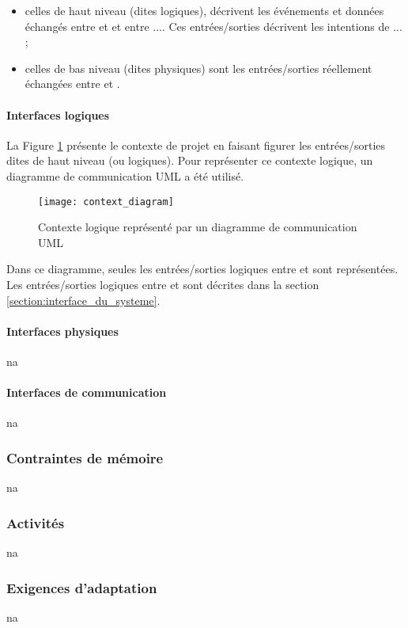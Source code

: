 \begin{itemize}
    \item celles de haut niveau (dites logiques), décrivent les événements et données échangés entre \complete et \complete et entre ...\complete. Ces entrées/sorties décrivent les intentions de \complete ... ;
    \item celles de bas niveau (dites physiques) sont les entrées/sorties réellement échangées entre \complete et \complete.
\end{itemize}

\paragraph{Interfaces logiques} %
La Figure \ref{contexte_logiqueUML} présente le contexte de projet en faisant figurer les entrées/sorties dites de haut niveau (ou logiques). Pour représenter ce contexte logique, un diagramme de communication UML a été utilisé.

\begin{figure} [H]
    \centering
    \texttt{[image: context\_diagram]}
    \caption{Contexte logique représenté par un diagramme de communication UML}
    \label{contexte_logiqueUML}
\end{figure}

Dans ce diagramme, seules les entrées/sorties logiques entre \complete et \complete sont représentées. Les entrées/sorties logiques entre \complete et \complete sont décrites dans la section \ref{section:interface_du_systeme}.


\paragraph{Interfaces physiques} %

\gls{na}

\paragraph{Interfaces de communication} %

\gls{na}

\subsubsection{Contraintes de mémoire} %

\gls{na}

\subsubsection{Activités} %

\gls{na}

\subsubsection{Exigences d'adaptation} %

\gls{na}